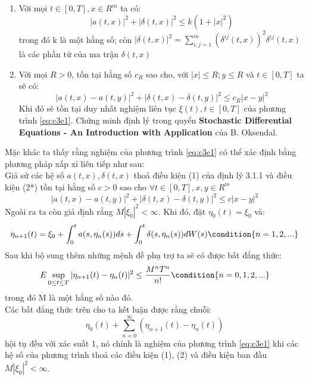\documentclass[14pt,a4paper]{article}
\numberwithin{equation}{section}
\begin{document}
\begin{enumerate}[(1)]
	\item Với mọi $t\in[0,T],x\in R^m$ ta có:
\begin{equation*}
	|a(t,x)|^2+|\delta(t,x)|^2\leq k(1+|x|^2)
\end{equation*}
trong đó k là một hằng số; còn $|\delta(t,x)|^2=\sum\limits_{i,j=1}^m(\delta^{ij}(t,x))^2\delta^{ij}(t,x)$ là các phần tử của ma trận $\delta(t,x)$
	\item Với mọi $R>0$, tồn tại hằng số $c_R$ sao cho, với $|x|\leq R;y\leq R$ và $t\in[0,T]$ ta sẽ có:
\begin{equation*}
	|a(t,x)-a(t,y)|^2+|\delta(t,x)-\delta(t,y)|^2\leq c_R|x-y|^2
\end{equation*}
Khi đó sẽ tồn tại duy nhất nghiệm liên tục $\xi(t),t\in[0,T]$ của phương trình \eqref{eq:c3e1}. Chứng minh định lý trong quyển \textbf{Stochastic Differential Equations - An Introduction with Application} của B. Oksendal.
\end{enumerate}
Mặc khác ta thấy rằng nghiệm của phương trình \eqref{eq:c3e1} có thể xác định bằng phương pháp xấp xỉ liên tiếp như sau:\\
Giả sử các hệ số $a(t,x),\delta(t,x)$ thoả điều kiện (1) của định lý 3.1.1 và điều kiện (2*) tồn tại hằng số $c>0$ sao cho $\forall t\in[0,T],x,y\in R^m$
\begin{equation*}
	|a(t,x)-a(t,y)|^2+|\delta(t,x)-\delta(t,y)|^2\leq c|x-y|^2
\end{equation*}
Ngoài ra ta còn giả định rằng $M|\xi_0|^2<\infty$. Khi đó, đặt $\eta_0(t)=\xi_0$ và:
\begin{equation*}
	\eta_{n+1}(t)=\xi_0+\int_{0}^ta(s,\eta_n(s))ds+\int_0^t\delta(s,\eta_n(s))dW(s) \condition{n=1,2,...}
\end{equation*}
Sau khi bộ sung thêm những mệnh đề phụ trợ ta sẽ có được bất đẳng thức:
\begin{equation*}
	E\sup_{0\leq t\leq T}|\eta_{n+1}(t)-\eta_n(t)|^2\leq\frac{M^nT^n}{n!} \condition{n=0,1,2,...}
\end{equation*}
trong đó M là một hằng số nào đó.\\
Các bất đẳng thức trên cho ta kết luận được rằng chuỗi:
\begin{equation*}
	\eta_0(t)+\sum_{n=0}^\infty(\eta_{n+1}(t)-\eta_n(t))
\end{equation*}
hội tụ đều với xác suất 1, nó chính là nghiệm của phương trình \eqref{eq:c3e1} khi các hệ số của phương trình thoả các điều kiện (1), (2) và điều kiện ban đầu $M|\xi_0|^2<\infty$.\\
\end{document}
